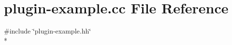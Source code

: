 \hypertarget{plugin-example_8cc}{}\section{plugin-\/example.cc File Reference}
\label{plugin-example_8cc}
{\ttfamily \#include \char`\"{}plugin-\/example.\+hh\char`\"{}}\\*
